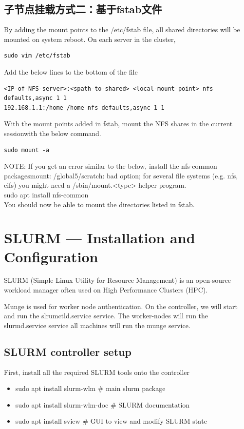 {\subsection{子节点挂载方式二：基于fstab文件}
By adding the mount points to the /etc/fstab file, all shared directories will be mounted on system reboot.
On each server in the cluster,
\begin{verbatim}
sudo vim /etc/fstab
\end{verbatim}
Add the below lines to the bottom of the file
\begin{verbatim}
<IP-of-NFS-server>:<spath-to-shared> <local-mount-point> nfs defaults,async 1 1
192.168.1.1:/home /home nfs defaults,async 1 1
\end{verbatim}
With the mount points added in fstab, mount the NFS shares in the current sessionwith the below
command.
\begin{verbatim}
sudo mount -a
\end{verbatim}
NOTE:
If you get an error similar to the below, install the nfs-common packagesmount: /global5/scratch: bad option; for several file systems (e.g. nfs, cifs) you might need a /sbin/mount.<type> helper program.\\
sudo apt install nfs-common\\
You should now be able to mount the directories listed in fstab.


\section{SLURM — Installation and Configuration}
SLURM (Simple Linux Utility for Resource Management) is an open-source workload manager often
used on High Performance Clusters (HPC).

Munge is used for worker node authentication.
On the controller, we will start and run the slrumctld.service service.
The worker-nodes will run the slurmd.service service all machines will run the munge service.

\subsection{SLURM controller setup}
First, install all the required SLURM tools onto the controller
\begin{itemize}
\item sudo apt install slurm-wlm \# main slurm package
\item sudo apt install slurm-wlm-doc \# SLURM documentation
\item sudo apt install sview \# GUI to view and modify SLURM state
\end{itemize}



}
